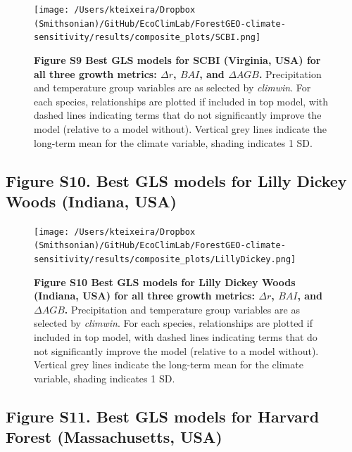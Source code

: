 \documentclass[
]{article}
\begin{document}
\begin{figure}
\centering
\texttt{[image: /Users/kteixeira/Dropbox (Smithsonian)/GitHub/EcoClimLab/ForestGEO-climate-sensitivity/results/composite\_plots/SCBI.png]}
\caption{\textbf{Figure S9 \textbar{} Best GLS models for SCBI
(Virginia, USA) for all three growth metrics: \(\Delta r\), \(BAI\), and
\(\Delta AGB\).} Precipitation and temperature group variables are as
selected by \emph{climwin}. For each species, relationships are plotted
if included in top model, with dashed lines indicating terms that do not
significantly improve the model (relative to a model without). Vertical
grey lines indicate the long-term mean for the climate variable, shading
indicates 1 SD.}
\end{figure}

\newpage

\hypertarget{figure-s10.-best-gls-models-for-lilly-dickey-woods-indiana-usa}{%
\subsection{Figure S10. Best GLS models for Lilly Dickey Woods (Indiana,
USA)}\label{figure-s10.-best-gls-models-for-lilly-dickey-woods-indiana-usa}}

\begin{figure}
\centering
\texttt{[image: /Users/kteixeira/Dropbox (Smithsonian)/GitHub/EcoClimLab/ForestGEO-climate-sensitivity/results/composite\_plots/LillyDickey.png]}
\caption{\textbf{Figure S10 \textbar{} Best GLS models for Lilly Dickey
Woods (Indiana, USA) for all three growth metrics: \(\Delta r\),
\(BAI\), and \(\Delta AGB\).} Precipitation and temperature group
variables are as selected by \emph{climwin}. For each species,
relationships are plotted if included in top model, with dashed lines
indicating terms that do not significantly improve the model (relative
to a model without). Vertical grey lines indicate the long-term mean for
the climate variable, shading indicates 1 SD.}
\end{figure}

\newpage

\hypertarget{figure-s11.-best-gls-models-for-harvard-forest-massachusetts-usa}{%
\subsection{Figure S11. Best GLS models for Harvard Forest
(Massachusetts,
USA)}\label{figure-s11.-best-gls-models-for-harvard-forest-massachusetts-usa}}
\end{document}
